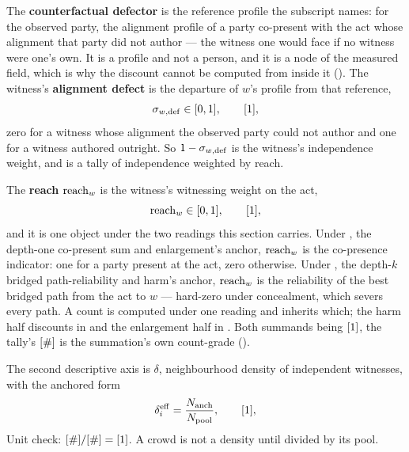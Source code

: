 \documentclass[../main]{subfiles}
\begin{document}
\begin{definition}
  The \textbf{counterfactual defector} is the reference profile the subscript names: for the
  observed party, the alignment profile of a party co-present with the act whose alignment
  that party did not author --- the witness one would face if no witness were one's own. It
  is a profile and not a person, and it is a node of the measured field, which is why the
  discount cannot be computed from inside it (). The witness's
  \textbf{alignment defect} is the departure of $w$'s profile from that reference,
  \begin{equation}
    \sigma\sb{w,\mathrm{def}}\in[0,1],\qquad[1],
    \label{eq:f:defector}
  \end{equation}
  zero for a witness whose alignment the observed party could not author and one for a
  witness authored outright. So $1-\sigma\sb{w,\mathrm{def}}$ is the witness's independence weight,
  and  is a tally of independence weighted by reach.
\end{definition}

\begin{definition}
  The \textbf{reach} $\operatorname{reach}_w$ is the witness's witnessing weight on the act,
  \begin{equation}
    \operatorname{reach}_w\in[0,1],\qquad[1],
    \label{eq:f:reach}
  \end{equation}
  and it is one object under the two readings this section carries. Under ,
  the depth-one co-present sum and enlargement's anchor, $\operatorname{reach}_w$ is the co-presence
  indicator: one for a party present at the act, zero otherwise. Under , the
  depth-$k$ bridged path-reliability and harm's anchor, $\operatorname{reach}_w$ is the reliability of the
  best bridged path from the act to $w$ --- hard-zero under concealment, which severs every
  path. A count is computed under one reading and inherits which; the harm half discounts in
   and the enlargement half in . Both summands being
  $[1]$, the tally's $[\#]$ is the summation's own count-grade
  ().
\end{definition}

\begin{definition}
  The second descriptive axis is $\delta$, neighbourhood density of independent witnesses,
  with the anchored form
  \begin{equation}
    \effdensity[i]=\frac{\countanch}{\countpool},\qquad\dimratio,
    \label{eq:f:eff}
  \end{equation}
  Unit check: $[\#]/[\#]=[1]$. A crowd is not a density until divided by
  its pool.
\end{definition}
\end{document}

